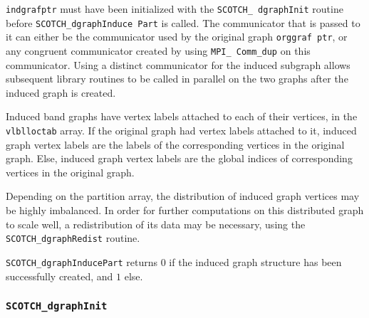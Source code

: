 \begin{itemize}
{\tt indgrafptr} must have been initialized with the {\tt SCOTCH\_\lbt
dgraph\lbt Init} routine before {\tt SCOTCH\_dgraph\lbt Induce\lbt
Part} is called. The communicator that is passed to it can either be
the communicator used by the original graph {\tt org\lbt graf\lbt
ptr}, or any congruent communicator created by using {\tt MPI\_\lbt
Comm\_\lbt dup} on this communicator. Using a distinct communicator
for the induced subgraph allows subsequent library routines to be
called in parallel on the two graphs after the induced graph is
created.

Induced band graphs have vertex labels attached to each of their
vertices, in the {\tt vlbl\lbt loc\lbt tab} array. If the original
graph had vertex labels attached to it, induced graph vertex labels
are the labels of the corresponding vertices in the original
graph. Else, induced graph vertex labels are the global indices of
corresponding vertices in the original graph.

Depending on the partition array, the distribution of induced graph
vertices may be highly imbalanced. In order for further computations
on this distributed graph to scale well, a redistribution of its data
may be necessary, using the {\tt SCOTCH\_dgraph\lbt Redist} routine.

\progret

{\tt SCOTCH\_dgraphInducePart} returns $0$ if the induced graph
structure has been successfully created, and $1$ else.
\end{itemize}

\subsubsection{{\tt SCOTCH\_dgraphInit}}
\label{sec-lib-dgraphinit}

